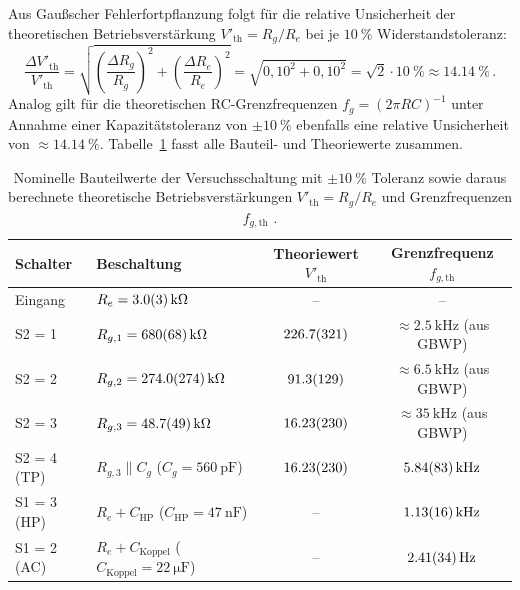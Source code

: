 \documentclass[12pt,a4paper,titlepage]{scrartcl}
\numberwithin{equation}{section}
\numberwithin{table}{section}
\numberwithin{figure}{section}
\begin{document}
Aus Gaußscher Fehlerfortpflanzung folgt für die relative Unsicherheit der theoretischen Betriebsverstärkung $V'_{\text{th}} = R_g / R_e$ bei je $\SI{10}{\percent}$ Widerstandstoleranz:
\begin{equation}
    \frac{\Delta V'_{\text{th}}}{V'_{\text{th}}} = \sqrt{\left(\frac{\Delta R_g}{R_g}\right)^2 + \left(\frac{\Delta R_e}{R_e}\right)^2} = \sqrt{0{,}10^2 + 0{,}10^2} = \sqrt{2}\cdot \SI{10}{\percent} \approx \SI{14.14}{\percent} \,.
    \label{eq:fehler_vth}
\end{equation}
Analog gilt für die theoretischen RC-Grenzfrequenzen $f_g = (2\pi R C)^{-1}$ unter Annahme einer Kapazitätstoleranz von $\pm\SI{10}{\percent}$ ebenfalls eine relative Unsicherheit von $\approx \SI{14.14}{\percent}$. Tabelle~\ref{tab:literaturwerte} fasst alle Bauteil- und Theoriewerte zusammen.

\begin{table}[H]
    \centering
    \caption{Nominelle Bauteilwerte der Versuchsschaltung mit $\pm\SI{10}{\percent}$ Toleranz sowie daraus berechnete theoretische Betriebsverstärkungen $V'_{\text{th}} = R_g / R_e$ und Grenzfrequenzen $f_{g,\text{th}}$ \cite{PAPskript}.}
    \label{tab:literaturwerte}
    \small
    \setlength{\tabcolsep}{5pt}
    \begin{tabular}{llcc}
        \toprule
        \textbf{Schalter} & \textbf{Beschaltung} & \textbf{Theoriewert $V'_{\text{th}}$} & \textbf{Grenzfrequenz $f_{g,\text{th}}$} \\
        \midrule
        Eingang & $R_e = \SI{3.0 +- 0.3}{\kilo\ohm}$ & -- & -- \\
        S2 = 1 & $R_{g,1} = \SI{680 +- 68}{\kilo\ohm}$ & $\num{226.7 +- 32.1}$ & $\approx \SI{2.5}{\kilo\hertz}$ (aus GBWP) \\
        S2 = 2 & $R_{g,2} = \SI{274 +- 27.4}{\kilo\ohm}$ & $\num{91.3 +- 12.9}$ & $\approx \SI{6.5}{\kilo\hertz}$ (aus GBWP) \\
        S2 = 3 & $R_{g,3} = \SI{48.7 +- 4.9}{\kilo\ohm}$ & $\num{16.23 +- 2.30}$ & $\approx \SI{35}{\kilo\hertz}$ (aus GBWP) \\
        S2 = 4 (TP) & $R_{g,3} \parallel C_g$ ($C_g = \SI{560}{\pico\farad}$) & $\num{16.23 +- 2.30}$ & $\SI{5.84 +- 0.83}{\kilo\hertz}$ \\
        S1 = 3 (HP) & $R_e + C_{\text{HP}}$ ($C_{\text{HP}} = \SI{47}{\nano\farad}$) & -- & $\SI{1.13 +- 0.16}{\kilo\hertz}$ \\
        S1 = 2 (AC) & $R_e + C_{\text{Koppel}}$ ($C_{\text{Koppel}} = \SI{22}{\micro\farad}$) & -- & $\SI{2.41 +- 0.34}{\hertz}$ \\
        \bottomrule
    \end{tabular}
\end{table}
\end{document}
